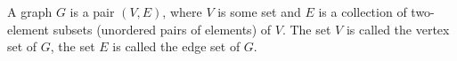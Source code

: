 

\setcounter{section}{1}
\setcounter{subsection}{1}
\setcounter{dfn}{0}

\begin{dfn}
\label{dfn:Graph}
A graph $G$ is a pair $(V,E)$, where $V$ is some set and $E$ is a collection of two-element subsets (unordered pairs of elements) of $V$.
The set $V$ is called the vertex set of $G$, the set $E$ is called the edge set of $G$.
\end{dfn}


